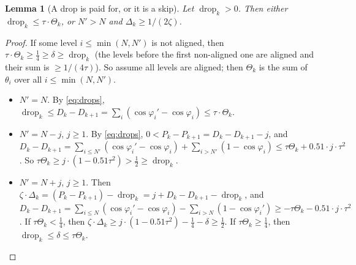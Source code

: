 \documentclass[11pt,letterpaper]{amsart}
\theoremstyle{plain}
\newtheorem{lemma}[theorem]{Lemma}
\theoremstyle{definition}
\theoremstyle{remark}
\begin{document}
\begin{lemma}[A drop is paid for, or it is a skip]\label{lem:skip}
Let $\operatorname{drop}_k>0$. Then either $\operatorname{drop}_k\le\tau\cdot\Theta_k$, or $N'>N$ and $\Delta_k\ge1/(2\zeta)$.
\end{lemma}
\begin{proof}
If some level $i\le\min(N,N')$ is not aligned, then $\tau\cdot\Theta_k\ge\tfrac14\ge\delta\ge\operatorname{drop}_k$ (the levels before the first non-aligned one are aligned and their sum is $\ge1/(4\tau)$). So assume all levels are aligned; then $\Theta_k$ is the sum of $\theta_i$ over all $i\le\min(N,N')$.
\begin{itemize}
\item $N'=N$. By \eqref{eq:drops}, $\operatorname{drop}_k\le D_k-D_{k+1}=\sum_i(\cos\varphi_i'-\cos\varphi_i)\le\tau\cdot\Theta_k$.
\item $N'=N-j$, $j\ge1$. By \eqref{eq:drops}, $0<P_k-P_{k+1}=D_k-D_{k+1}-j$, and $D_k-D_{k+1}=\sum_{i\le N'}(\cos\varphi_i'-\cos\varphi_i)+\sum_{i>N'}(1-\cos\varphi_i)\le\tau\Theta_k+0.51\cdot j\cdot\tau^2$. So $\tau\Theta_k\ge j\cdot(1-0.51\tau^2)>\tfrac12\ge\operatorname{drop}_k$.
\item $N'=N+j$, $j\ge1$. Then $\zeta\cdot\Delta_k=(P_k-P_{k+1})-\operatorname{drop}_k=j+D_k-D_{k+1}-\operatorname{drop}_k$, and $D_k-D_{k+1}=\sum_{i\le N}(\cos\varphi_i'-\cos\varphi_i)-\sum_{i>N}(1-\cos\varphi_i')\ge-\tau\Theta_k-0.51\cdot j\cdot\tau^2$. If $\tau\Theta_k<\tfrac14$, then $\zeta\cdot\Delta_k\ge j\cdot(1-0.51\tau^2)-\tfrac14-\delta\ge\tfrac12$. If $\tau\Theta_k\ge\tfrac14$, then $\operatorname{drop}_k\le\delta\le\tau\Theta_k$.
\end{itemize}
\end{proof}
\end{document}
